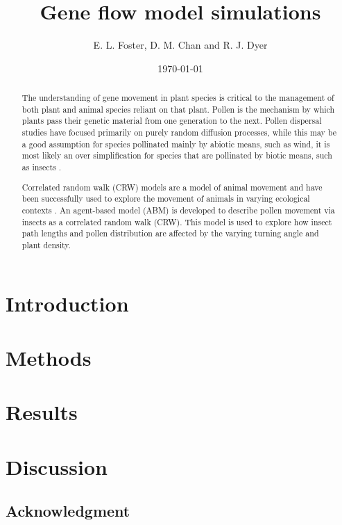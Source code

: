 \documentclass{article}
\title{Gene flow model simulations}
\author{ E. L. Foster, D. M. Chan and R. J. Dyer }
\date{\today}
\begin{document}
\maketitle

\begin{abstract} 
  The understanding of gene movement in plant species is critical to the management
  of both plant and animal species reliant on that plant.  Pollen is the mechanism by which plants
  pass their genetic material from one generation to the next. Pollen dispersal studies have focused
  primarily on purely random diffusion processes, while this may be a good assumption for species
  pollinated mainly by abiotic means, such as wind, it is most likely an over simplification for
  species that are pollinated by biotic means, such as insects \cite{Chan}.

  Correlated random walk (CRW) models are a model of animal movement \cite{Prasad05} and have been
  successfully used to explore the movement of animals in varying ecological contexts
  \cite{Bartumeus07}. An agent-based model (ABM) is developed to describe pollen movement via insects
  as a correlated random walk (CRW). This model is used to explore how insect path lengths and pollen
  distribution are affected by the varying turning angle and plant density.  
\end{abstract}

\section{{\bf Introduction}}
  
\section{{\bf Methods}}
  
\section{{\bf Results}}
  
\section{{\bf Discussion}}
\subsection*{Acknowledgment}



\end{document}
